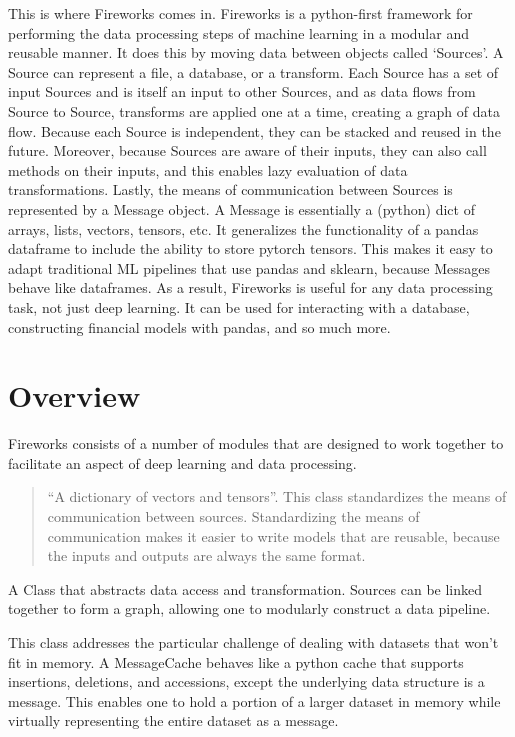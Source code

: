 \documentclass[letterpaper,10pt,english]{sphinxmanual}
\begin{document}
This is where Fireworks comes in. Fireworks is a python-first framework for performing the data processing steps of machine learning in a modular and reusable manner. It does this by moving data between objects called ‘Sources’. A Source can represent a file, a database, or a transform. Each Source has a set of input Sources and is itself an input to other Sources, and as data flows from Source to Source, transforms are applied one at a time, creating a graph of data flow. Because each Source is independent, they can be stacked and reused in the future. Moreover, because Sources are aware of their inputs, they can also call methods on their inputs, and this enables lazy evaluation of data transformations. Lastly, the means of communication between Sources is represented by a Message object. A Message is essentially a (python) dict of arrays, lists, vectors, tensors, etc. It generalizes the functionality of a pandas dataframe to include the ability to store pytorch tensors. This makes it easy to adapt traditional ML pipelines that use pandas and sklearn, because Messages behave like dataframes. As a result, Fireworks is useful for any data processing task, not just deep learning. It can be used for interacting with a database, constructing financial models with pandas, and so much more.


\chapter{Overview}
\label{\detokenize{index:overview}}
Fireworks consists of a number of modules that are designed to work together to facilitate an aspect of deep learning and data processing.

\begin{quote}

“A dictionary of vectors and tensors”. This class standardizes the means of communication between sources. Standardizing the means of communication makes it easier to write models that are reusable, because the inputs and outputs are always the same format.
\end{quote}


A Class that abstracts data access and transformation. Sources can be linked together to form a graph, allowing one to modularly construct a data pipeline.


This class addresses the particular challenge of dealing with datasets that won’t fit in memory. A MessageCache behaves like a python cache that supports insertions, deletions, and accessions, except the underlying data structure is a message. This enables one to hold a portion of a larger dataset in memory  while virtually representing the entire dataset as a message.
\end{document}
